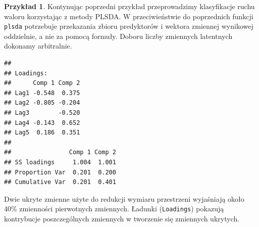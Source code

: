 \documentclass[
]{book}
\newenvironment{Shaded}{\begin{snugshade}}{\end{snugshade}}
\newcommand{\AttributeTok}[1]{\textcolor[rgb]{0.13,0.29,0.53}{#1}}
\newcommand{\DecValTok}[1]{\textcolor[rgb]{0.00,0.00,0.81}{#1}}
\newcommand{\FunctionTok}[1]{\textcolor[rgb]{0.13,0.29,0.53}{\textbf{#1}}}
\newcommand{\NormalTok}[1]{#1}
\newcommand{\OtherTok}[1]{\textcolor[rgb]{0.56,0.35,0.01}{#1}}
\newcommand{\SpecialCharTok}[1]{\textcolor[rgb]{0.81,0.36,0.00}{\textbf{#1}}}
\theoremstyle{plain}
\theoremstyle{definition}
\theoremstyle{definition}
\theoremstyle{definition}
\newtheorem{example}{Przykład}[chapter]
\theoremstyle{definition}
\theoremstyle{definition}
\theoremstyle{remark}
\begin{document}
\begin{example}
\protect\hypertarget{exm:plsda}{}\label{exm:plsda}Kontynując poprzedni przykład przeprowadzimy klasyfikacje ruchu waloru korzystając z metody PLSDA. W przeciwieństwie do poprzednich funkcji \texttt{plsda} potrzebuje przekazania zbioru predyktorów i wektora zmiennej wynikowej oddzielnie, a nie za pomocą formuły. Doboru liczby zmiennych latentnych dokonamy arbitralnie.
\end{example}

\begin{Shaded}
\end{Shaded}

\begin{verbatim}
## 
## Loadings:
##      Comp 1 Comp 2
## Lag1 -0.548  0.375
## Lag2 -0.805 -0.204
## Lag3        -0.520
## Lag4 -0.143  0.652
## Lag5  0.186  0.351
## 
##                Comp 1 Comp 2
## SS loadings     1.004  1.001
## Proportion Var  0.201  0.200
## Cumulative Var  0.201  0.401
\end{verbatim}

Dwie ukryte zmienne użyte do redukcji wymiaru przestrzeni wyjaśniają około 40\% zmienności pierwotnych zmiennych. Ładunki (\texttt{Loadings}) pokazują kontrybucje poszczególnych zmiennych w tworzenie się zmiennych ukrytych.

\begin{Shaded}
\end{Shaded}
\end{document}
